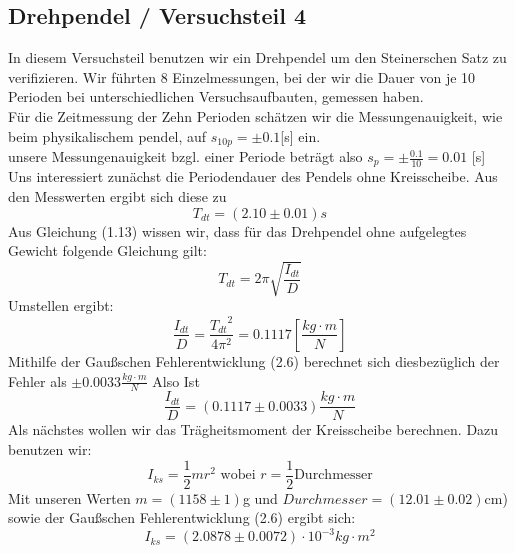 \documentclass[11pt,a4paper]{article}
\begin{document}
	\subsection{Drehpendel / Versuchsteil 4}
	In diesem Versuchsteil benutzen wir ein Drehpendel um den Steinerschen Satz zu verifizieren.
	Wir führten 8 Einzelmessungen, bei der wir die  Dauer von je 10 Perioden bei unterschiedlichen Versuchsaufbauten, gemessen haben.\\
	Für die Zeitmessung der Zehn Perioden schätzen wir die Messungenauigkeit, wie beim physikalischem pendel, auf $s_{10p}=\pm 0.1$[s] ein.\\
	unsere Messungenauigkeit bzgl. einer Periode beträgt also $s_p=\pm \frac{0.1}{10} =0.01$ [s]
	\\
	Uns interessiert zunächst die Periodendauer des Pendels ohne Kreisscheibe. Aus den Messwerten
	ergibt sich diese zu $$T_{dt}=(2.10\pm 0.01)s$$
	Aus Gleichung (1.13) wissen wir, dass für das Drehpendel ohne aufgelegtes Gewicht folgende Gleichung gilt:
	\begin{equation}
	T_{dt}=2 \pi \sqrt{\frac{I_{dt}}{D}}
	\end{equation}
	Umstellen ergibt:
	\begin{equation}
	\frac{I_{dt}}{D} = \frac{{T_{dt}}^2}{4 \pi^2}=0.1117[\frac{kg\cdot m}{N}]
	\end{equation}
	Mithilfe der Gaußschen Fehlerentwicklung (2.6) berechnet sich diesbezüglich der Fehler als $\pm 0.0033
	\frac{kg \cdot m}{N}$
	Also Ist
	\begin{equation}
	\frac{I_{dt}}{D} =(0.1117 \pm 0.0033)\frac{kg\cdot m}{N}
	\end{equation}
	Als nächstes wollen wir das Trägheitsmoment der Kreisscheibe berechnen. Dazu benutzen wir:
	\begin{equation}
	I_{ks}=\frac{1}{2}m r^2 \text{  wobei  } r=\frac{1}{2} \text{Durchmesser}
	\end{equation}
	Mit unseren Werten $m=(1158\pm 1)$g und $Durchmesser=(12.01 \pm 0.02)$cm) sowie der Gaußschen
	Fehlerentwicklung (2.6) ergibt sich:
	\begin{equation}
	I_{ks}=(2.0878 \pm 0.0072)\cdot 10^{-3} kg \cdot m^2
	\end{equation}
\end{document}
